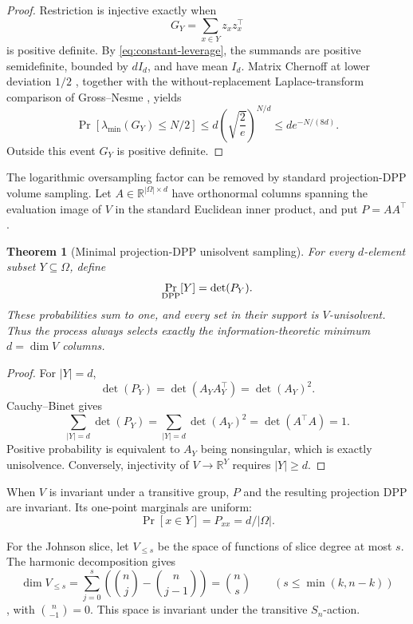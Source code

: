 \documentclass[11pt]{article}
\newtheorem{theorem}{Theorem}[section]
\theoremstyle{definition}
\theoremstyle{remark}
\newcommand{\R}{\mathbb R}
\newcommand{\1}{\mathbf 1}
\begin{document}
\begin{proof}
Restriction is injective exactly when
\[
 G_Y=\sum_{x\in Y}z_xz_x^\top
\]
is positive definite.  By \eqref{eq:constant-leverage}, the summands are
positive semidefinite, bounded by $dI_d$, and have mean $I_d$.  Matrix
Chernoff at lower deviation $1/2$ \cite{Tropp}, together with the
without-replacement Laplace-transform comparison of Gross--Nesme
\cite{GrossNesme}, yields
\[
 \Pr[\lambda_{\min}(G_Y)\le N/2]
 \le d\left(\sqrt{\frac2e}\right)^{N/d}
 \le d e^{-N/(8d)}.
\]
Outside this event $G_Y$ is positive definite.
\end{proof}

The logarithmic oversampling factor can be removed by standard projection-DPP
volume sampling.  Let $A\in\R^{|\Omega|\times d}$ have orthonormal columns
spanning the evaluation image of $V$ in the standard Euclidean inner product,
and put $P=AA^\top$.

\begin{theorem}[Minimal projection-DPP unisolvent sampling]
\label{thm:dpp-unisolvent}
For every $d$-element subset $Y\subseteq\Omega$, define
\[
 \Pr_{\rm DPP}[Y]=\det(P_Y).
\]
These probabilities sum to one, and every set in their support is
$V$-unisolvent.  Thus the process always selects exactly the
information-theoretic minimum $d=\dim V$ columns.
\end{theorem}

\begin{proof}
For $|Y|=d$,
\[
 \det(P_Y)=\det(A_YA_Y^\top)=\det(A_Y)^2.
\]
Cauchy--Binet gives
\[
 \sum_{|Y|=d}\det(P_Y)
 =\sum_{|Y|=d}\det(A_Y)^2
 =\det(A^\top A)=1.
\]
Positive probability is equivalent to $A_Y$ being nonsingular, which is
exactly unisolvence.  Conversely, injectivity of $V\to\R^Y$ requires
$|Y|\ge d$.
\end{proof}

When $V$ is invariant under a transitive group, $P$ and the resulting
projection DPP are invariant.  Its one-point marginals are uniform:
\[
 \Pr[x\in Y]=P_{xx}=d/|\Omega|.
\]

For the Johnson slice, let $V_{\le s}$ be the space of functions of slice
degree at most $s$.  The harmonic decomposition gives
\begin{equation}\label{eq:slice-degree-dimension}
 \dim V_{\le s}
 =\sum_{j=0}^s\left(\binom nj-\binom n{j-1}\right)
 =\binom ns
 \qquad(s\le\min(k,n-k))
\end{equation}
\cite{FilmusOrthogonal}, with $\binom n{-1}=0$.  This space is invariant
under the transitive $S_n$-action.
\end{document}
